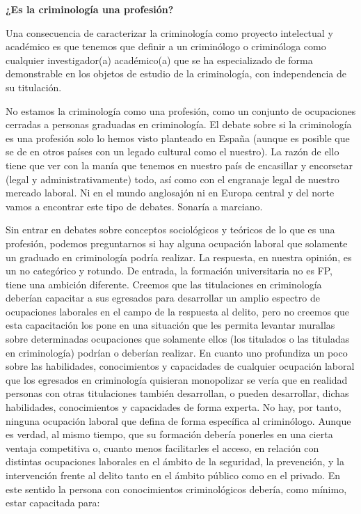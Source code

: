 \documentclass[
  spanish,
  letterpaper,
  DIV=11,
  numbers=noendperiod]{scrreprt}
\begin{document}
\begin{tcolorbox}[enhanced jigsaw, bottomtitle=1mm, toprule=.15mm, colbacktitle=quarto-callout-note-color!10!white, bottomrule=.15mm, leftrule=.75mm, colframe=quarto-callout-note-color-frame, opacitybacktitle=0.6, titlerule=0mm, breakable, colback=white, left=2mm, arc=.35mm, title=\textcolor{quarto-callout-note-color}{\faInfo}\hspace{0.5em}{Nota}, toptitle=1mm, coltitle=black, rightrule=.15mm, opacityback=0]

\textbf{¿Es la criminología una profesión?}

Una consecuencia de caracterizar la criminología como proyecto
intelectual y académico es que tenemos que definir a un criminólogo o
criminóloga como cualquier investigador(a) académico(a) que se ha
especializado de forma demonstrable en los objetos de estudio de la
criminología, con independencia de su titulación.

No estamos la criminología como una profesión, como un conjunto de
ocupaciones cerradas a personas graduadas en criminología. El debate
sobre si la criminología es una profesión solo lo hemos visto planteado
en España (aunque es posible que se de en otros países con un legado
cultural como el nuestro). La razón de ello tiene que ver con la manía
que tenemos en nuestro país de encasillar y encorsetar (legal y
administrativamente) todo, así como con el engranaje legal de nuestro
mercado laboral. Ni en el mundo anglosajón ni en Europa central y del
norte vamos a encontrar este tipo de debates. Sonaría a marciano.

Sin entrar en debates sobre conceptos sociológicos y teóricos de lo que
es una profesión, podemos preguntarnos si hay alguna ocupación laboral
que solamente un graduado en criminología podría realizar. La respuesta,
en nuestra opinión, es un no categórico y rotundo. De entrada, la
formación universitaria no es FP, tiene una ambición diferente. Creemos
que las titulaciones en criminología deberían capacitar a sus egresados
para desarrollar un amplio espectro de ocupaciones laborales en el campo
de la respuesta al delito, pero no creemos que esta capacitación los
pone en una situación que les permita levantar murallas sobre
determinadas ocupaciones que solamente ellos (los titulados o las
tituladas en criminología) podrían o deberían realizar. En cuanto uno
profundiza un poco sobre las habilidades, conocimientos y capacidades de
cualquier ocupación laboral que los egresados en criminología quisieran
monopolizar se vería que en realidad personas con otras titulaciones
también desarrollan, o pueden desarrollar, dichas habilidades,
conocimientos y capacidades de forma experta. No hay, por tanto, ninguna
ocupación laboral que defina de forma específica al criminólogo. Aunque
es verdad, al mismo tiempo, que su formación debería ponerles en una
cierta ventaja competitiva o, cuanto menos facilitarles el acceso, en
relación con distintas ocupaciones laborales en el ámbito de la
seguridad, la prevención, y la intervención frente al delito tanto en el
ámbito público como en el privado. En este sentido la persona con
conocimientos criminológicos debería, como mínimo, estar capacitada
para:


\end{tcolorbox}
\end{document}
